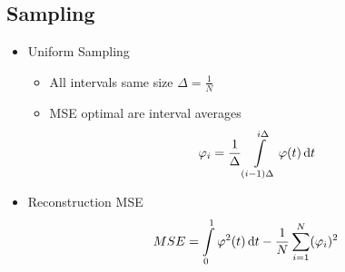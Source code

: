 \subsection{Sampling}
\begin{itemize}
	\item
		Uniform Sampling
		\begin{itemize}
			\item
				All intervals same size $\Delta  = \frac1N$
			\item
				MSE optimal are interval averages
				\begin{align*}
					\phi_i = \frac1\Delta \intop_{(i-1)\Delta}^{i\Delta} \phi(t) \id t
				\end{align*}
		\end{itemize}
	\item
		Reconstruction MSE
		\begin{align*}
			MSE = \intop_0^1 \phi^2(t) \id t - \frac1N \sum_{i=1}^N (\phi_i)^2
		\end{align*}
\end{itemize}

